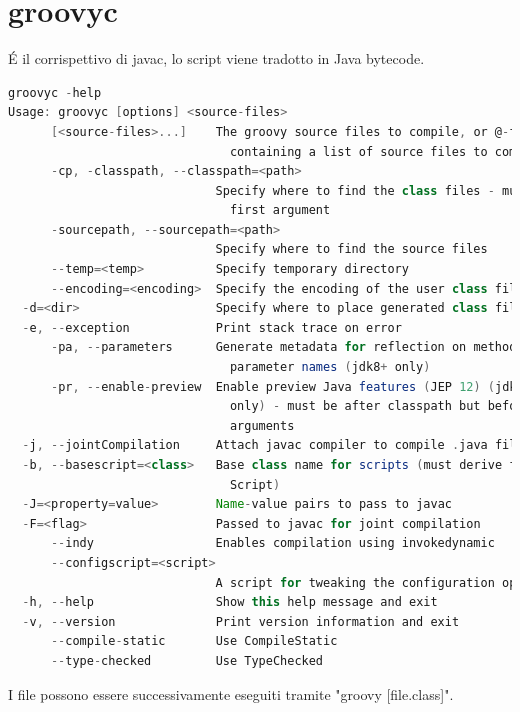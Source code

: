 \documentclass[11pt,a4paper]{book}
\begin{document}
\section{groovyc}
É il corrispettivo di javac, lo script viene tradotto in Java bytecode.
\begin{lstlisting}[language = groovy]
groovyc -help                                                                                  
Usage: groovyc [options] <source-files>
      [<source-files>...]    The groovy source files to compile, or @-files
                               containing a list of source files to compile
      -cp, -classpath, --classpath=<path>
                             Specify where to find the class files - must be
                               first argument
      -sourcepath, --sourcepath=<path>
                             Specify where to find the source files
      --temp=<temp>          Specify temporary directory
      --encoding=<encoding>  Specify the encoding of the user class files
  -d=<dir>                   Specify where to place generated class files
  -e, --exception            Print stack trace on error
      -pa, --parameters      Generate metadata for reflection on method
                               parameter names (jdk8+ only)
      -pr, --enable-preview  Enable preview Java features (JEP 12) (jdk12+
                               only) - must be after classpath but before other
                               arguments
  -j, --jointCompilation     Attach javac compiler to compile .java files
  -b, --basescript=<class>   Base class name for scripts (must derive from
                               Script)
  -J=<property=value>        Name-value pairs to pass to javac
  -F=<flag>                  Passed to javac for joint compilation
      --indy                 Enables compilation using invokedynamic
      --configscript=<script>
                             A script for tweaking the configuration options
  -h, --help                 Show this help message and exit
  -v, --version              Print version information and exit
      --compile-static       Use CompileStatic
      --type-checked         Use TypeChecked
\end{lstlisting}

I file possono essere successivamente eseguiti tramite "groovy [file.class]".
\end{document}
